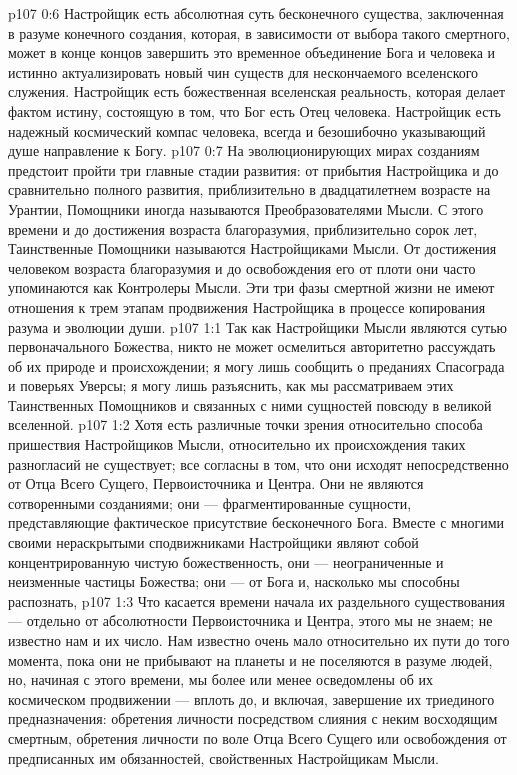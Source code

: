 \vs p107 0:6 Настройщик есть абсолютная суть бесконечного существа, заключенная в разуме конечного создания, которая, в зависимости от выбора такого смертного, может в конце концов завершить это временное объединение Бога и человека и истинно актуализировать новый чин существ для нескончаемого вселенского служения. Настройщик есть божественная вселенская реальность, которая делает фактом истину, состоящую в том, что Бог есть Отец человека. Настройщик есть надежный космический компас человека, всегда и безошибочно указывающий душе направление к Богу.
\vs p107 0:7 \pc На эволюционирующих мирах созданиям предстоит пройти три главные стадии развития: от прибытия Настройщика и до сравнительно полного развития, приблизительно в двадцатилетнем возрасте на Урантии, Помощники иногда называются Преобразователями Мысли. С этого времени и до достижения возраста благоразумия, приблизительно сорок лет, Таинственные Помощники называются Настройщиками Мысли. От достижения человеком возраста благоразумия и до освобождения его от плоти они часто упоминаются как Контролеры Мысли. Эти три фазы смертной жизни не имеют отношения к трем этапам продвижения Настройщика в процессе копирования разума и эволюции души.
\vs p107 1:1 Так как Настройщики Мысли являются сутью первоначального Божества, никто не может осмелиться авторитетно рассуждать об их природе и происхождении; я могу лишь сообщить о преданиях Спасограда и поверьях Уверсы; я могу лишь разъяснить, как мы рассматриваем этих Таинственных Помощников и связанных с ними сущностей повсюду в великой вселенной.
\vs p107 1:2 Хотя есть различные точки зрения относительно способа пришествия Настройщиков Мысли, относительно их происхождения таких разногласий не существует; все согласны в том, что они исходят непосредственно от Отца Всего Сущего, Первоисточника и Центра. Они не являются сотворенными созданиями; они --- фрагментированные сущности, представляющие фактическое присутствие бесконечного Бога. Вместе с многими своими нераскрытыми сподвижниками Настройщики являют собой концентрированную чистую божественность, они --- неограниченные и неизменные частицы Божества; они --- от Бога и, насколько мы способны распознать, 
\vs p107 1:3 Что касается времени начала их раздельного существования --- отдельно от абсолютности Первоисточника и Центра, этого мы не знаем; не известно нам и их число. Нам известно очень мало относительно их пути до того момента, пока они не прибывают на планеты и не поселяются в разуме людей, но, начиная с этого времени, мы более или менее осведомлены об их космическом продвижении --- вплоть до, и включая, завершение их триединого предназначения: обретения личности посредством слияния с неким восходящим смертным, обретения личности по воле Отца Всего Сущего или освобождения от предписанных им обязанностей, свойственных Настройщикам Мысли.
